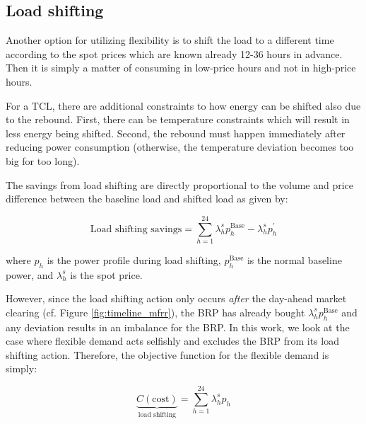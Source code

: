 \subsection{Load shifting}

Another option for utilizing flexibility is to shift the load to a different time according to the spot prices which are known already 12-36 hours in advance. Then it is simply a matter of consuming in low-price hours and not in high-price hours.

For a TCL, there are additional constraints to how energy can be shifted also due to the rebound. First, there can be temperature constraints which will result in less energy being shifted. Second, the rebound must happen immediately after reducing power consumption (otherwise, the temperature deviation becomes too big for too long).

The savings from load shifting are directly proportional to the volume and price difference between the baseline load and shifted load as given by:

\begin{equation}\label{eq:load_shifting_savings}
    \text{Load shifting savings} = \sum_{h=1}^{24} \lambda^{s}_{h} p^{\text{Base}}_{h} - \lambda^{s}_{h} p^{\prime}_{h}
\end{equation}

where $p_{h}$ is the power profile during load shifting, $p^{\text{Base}}_{h}$ is the normal baseline power, and $\lambda^{s}_{h}$ is the spot price. 

However, since the load shifting action only occurs \textit{after} the day-ahead market clearing (cf. Figure \ref{fig:timeline_mfrr}), the BRP has already bought $\lambda^{s}_{h} p^{\text{Base}}_{h}$ and any deviation results in an imbalance for the BRP. In this work, we look at the case where flexible demand acts selfishly and excludes the BRP from its load shifting action. Therefore, the objective function for the flexible demand is simply:

\begin{equation}\label{eq:LoadShiftingObjective}
    \underbrace{C(\text{cost})}_{\text{load shifting}} = \sum_{h=1}^{24} \lambda_{h}^{s} p_{h}
\end{equation}
